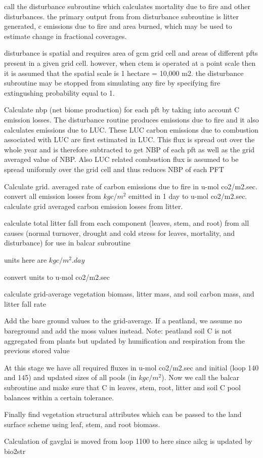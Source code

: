 call the disturbance subroutine which calculates mortality due to fire and other disturbances. the primary output from from disturbance subroutine is litter generated, c emissions due to fire and area burned, which may be used to estimate change in fractional coverages.

disturbance is spatial and requires area of gcm grid cell and areas of different pfts present in a given grid cell. however, when ctem is operated at a point scale then it is assumed that the spatial scale is 1 hectare = 10,000 m2. the disturbance subroutine may be stopped from simulating any fire by specifying fire extingushing probability equal to 1.

Calculate nbp (net biome production) for each pft by taking into account C emission losses. The disturbance routine produces emissions due to fire and it also calculates emissions due to L\+U\+C. These L\+U\+C carbon emissions due to combustion associated with L\+U\+C are first estimated in L\+U\+C. This flux is spread out over the whole year and is therefore subtracted to get N\+B\+P of each pft as well as the grid averaged value of N\+B\+P. Also L\+U\+C related combustion flux is assumed to be spread uniformly over the grid cell and thus reduces N\+B\+P of each P\+F\+T

Calculate grid. averaged rate of carbon emissions due to fire in u-\/mol co2/m2.\+sec. convert all emission losses from $kg c/m^2$ emitted in 1 day to u-\/mol co2/m2.\+sec. calculate grid averaged carbon emission losses from litter.

calculate total litter fall from each component (leaves, stem, and root) from all causes (normal turnover, drought and cold stress for leaves, mortality, and disturbance) for use in balcar subroutine

units here are $kg c/m^2 .day$

convert units to u-\/mol co2/m2.\+sec

calculate grid-\/average vegetation biomass, litter mass, and soil carbon mass, and litter fall rate

Add the bare ground values to the grid-\/average. If a peatland, we assume no bareground and add the moss values instead. Note\+: peatland soil C is not aggregated from plants but updated by humification and respiration from the previous stored value

At this stage we have all required fluxes in u-\/mol co2/m2.\+sec and initial (loop 140 and 145) and updated sizes of all pools (in $kg c/m^2$). Now we call the balcar subroutine and make sure that C in leaves, stem, root, litter and soil C pool balances within a certain tolerance.

Finally find vegetation structural attributes which can be passed to the land surface scheme using leaf, stem, and root biomass.

Calculation of gavglai is moved from loop 1100 to here since ailcg is updated by bio2str